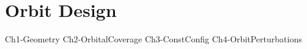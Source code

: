 % 
%





\setlength{\parindent}{0pt}

\usepackage{epigraph}
\usepackage{tocloft}




\newpage\thispagestyle{EmptyPage}
\mbox{}\newpage


\setcounter{tocdepth}{3}
\tableofcontents
\pagebreak

\renewcommand{\cfttabnumwidth}{4em}
\listoftables
\pagebreak

\renewcommand{\cftfignumwidth}{4em}
\listoffigures



\newpage
{}
%

\part{Orbit Design}
{Ch1-Geometry}
{Ch2-OrbitalCoverage}
{Ch3-ConstConfig}
{Ch4-OrbitPerturbations}




 

